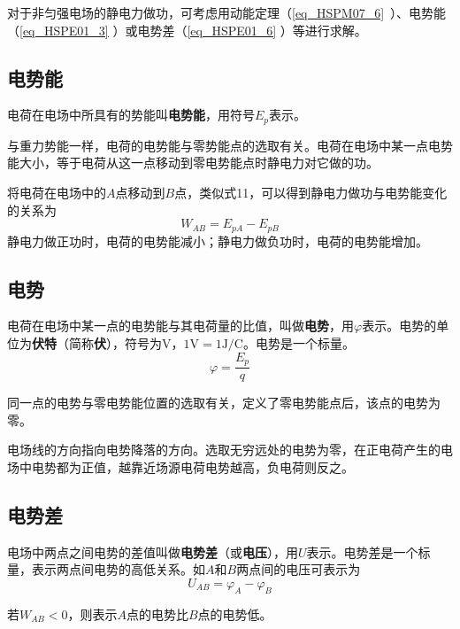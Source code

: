 对于非匀强电场的静电力做功，可考虑用动能定理（\autoref{eq_HSPM07_6}~）、电势能（\autoref{eq_HSPE01_3} ）或电势差（\autoref{eq_HSPE01_6} ）等进行求解。

\subsection{电势能}

电荷在电场中所具有的势能叫\textbf{电势能}，用符号$E_p$表示。

与重力势能一样，电荷的电势能与零势能点的选取有关。电荷在电场中某一点电势能大小，等于电荷从这一点移动到零电势能点时静电力对它做的功。

将电荷在电场中的$A$点移动到$B$点，类似式11，可以得到静电力做功与电势能变化的关系为
\begin{equation}\label{eq_HSPE01_3}
W_{AB}=E_{pA}-E_{pB}
\end{equation}
静电力做正功时，电荷的电势能减小；静电力做负功时，电荷的电势能增加。

\subsection{电势}

电荷在电场中某一点的电势能与其电荷量的比值，叫做\textbf{电势}，用$\varphi$表示。电势的单位为\textbf{伏特}（简称\textbf{伏}），符号为$\mathrm{V}$，$1\mathrm{V}=1\mathrm{J/C}$。电势是一个标量。
\begin{equation}\label{eq_HSPE01_7}
\varphi = \frac{E_p}{q}
\end{equation}

同一点的电势与零电势能位置的选取有关，定义了零电势能点后，该点的电势为零。

电场线的方向指向电势降落的方向。选取无穷远处的电势为零，在正电荷产生的电场中电势都为正值，越靠近场源电荷电势越高，负电荷则反之。

\subsection{电势差}

电场中两点之间电势的差值叫做\textbf{电势差}（或\textbf{电压}），用$U$表示。电势差是一个标量，表示两点间电势的高低关系。如$A$和$B$两点间的电压可表示为
\begin{equation}\label{eq_HSPE01_4}
U_{AB}=\varphi_A - \varphi_B
\end{equation}

若$W_{AB} < 0$，则表示$A$点的电势比$B$点的电势低。

